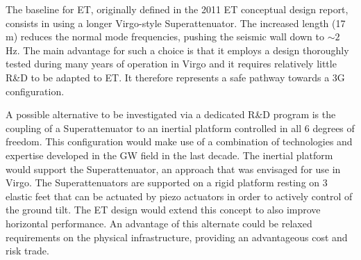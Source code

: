 The baseline for ET, originally defined in the 2011 ET conceptual design report, consists in using a longer Virgo-style
Superattenuator. The increased length (17\,m) reduces the normal mode frequencies, pushing
the seismic wall down to $\sim 2$\,Hz. The main advantage for such a choice is that it employs a design
thoroughly tested during many years of operation in Virgo and it requires relatively little R\&D to be
adapted to ET. It therefore represents a safe pathway towards a 3G configuration.

A possible alternative to be investigated via a dedicated R\&D program is the
coupling of a Superattenuator to an inertial platform controlled in all 6
degrees of freedom. 
This configuration would make use of a combination
of technologies and expertise developed in the GW field in the last decade. The
inertial platform would support the Superattenuator, an approach that was
envisaged for use in Virgo. The Superattenuators are supported on a rigid
platform resting on 3 elastic feet that can be actuated by piezo actuators in
order to actively control of the ground tilt. The ET design would extend this concept to also improve horizontal performance.
An advantage of this alternate could be relaxed requirements on the physical infrastructure, providing an advantageous cost and risk trade.



